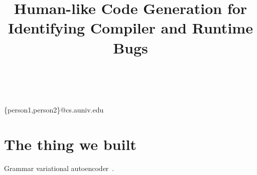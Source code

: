 


        
\title{Human-like Code Generation for Identifying Compiler and Runtime Bugs}

%
%
{ \\
          \\
        }
{\{person1,person2\}@cs.auniv.edu}

\maketitle





\section{The thing we built}
Grammar variational autoencoder~\cite{Kusner2017}.










\printbibliography
        
